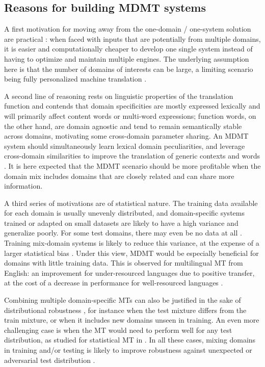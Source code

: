 \subsection{Reasons for building MDMT systems \label{ssec:whymdmt}}

A first motivation for moving away from the one-domain / one-system solution are practical  \cite{Sennrich13multidomain,Farajian17neural}: when faced with inputs that are potentially from multiple domains, it is easier and computationally cheaper to develop one single system instead of having to optimize and maintain multiple engines. The underlying assumption here is that the number of domains of interests can be large, a limiting scenario being fully personalized machine translation \cite{Michel18extreme}.

A second line of reasoning rests on linguistic properties of the translation function and contends that domain specificities are mostly expressed lexically and will primarily affect content words or multi-word expressions; function words, on the other hand, are domain agnostic and tend to remain semantically stable across domains, motivating some cross-domain parameter sharing. An MDMT system should simultaneously learn lexical domain peculiarities, and leverage cross-domain similarities to improve the translation of generic contexts and words \cite{Zeng18multidomain,Pham19generic}. It is here expected that the MDMT scenario should be more profitable when the domain mix includes domains that are closely related and can share more information.

A third series of motivations are of statistical nature. The training data available for each domain is usually unevenly distributed, and domain-specific systems trained or adapted on small datasets are likely to have a high variance and generalize poorly. For some test domains, there may even be no data at all \cite{Farajian17neural}. Training mix-domain systems is likely to reduce this variance, at the expense of a larger statistical bias \cite{Clark12onesystem}. Under this view, MDMT would be especially beneficial for domains with little training data. This is observed for multilingual MT from English: an improvement for under-resourced languages due to positive transfer, at the cost of a decrease in performance for well-resourced languages \cite{Arivazhagan19massively}.

Combining multiple domain-specific MTs can also be justified in the sake of distributional robustness \cite{Mansour09domain,Mansour09multiple}, for instance when the test mixture differs from the train mixture, or when it includes new domains unseen in training.
An even more challenging case is when the MT would need to perform well for any test distribution, as studied for statistical MT in \cite{Huck15mixeddomain}. In all these cases, mixing domains in training and/or testing is likely to improve robustness against unexpected or adversarial test distribution \cite{Oren19distributionally}.

